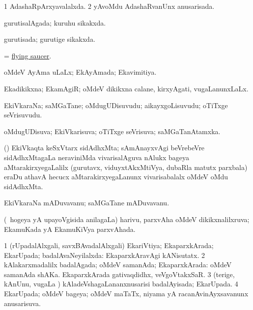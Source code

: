 \bentry
{} 
\gl{\gu}
\bmng
\bnum
\num{1} AdashaRpArxyavalalxda. 
\num{2} yAvoMdu AdashaRvanUnx anusarisada. 
\enum
\emng
\eentry

\bentry
{} 
\gl{\gu}
\expl{}
\bmng
gurutisalAgada; kuruhu sikakxda. 
\emng
\eentry

\bentry
{} 
\gl{\gu}
\expl{}
\bmng
gurutisada; gurutige sikakxda. 
\emng
\eentry

\bentry
{}
\gl{\nA}
\expl{}
\bmng
= \hyperref{kandict_f.pdf}{F}{flying saucer}{flying saucer}. 
\emng
\eentry

\bentry
{} 
\gl{\gu}
\expl{}
\bmng
oMdeV AyAma uLaLx; EkAyAmada; Ekavimitiya. 
\emng
\eentry

\bentry
{} 
\gl{\gu}
\expl{}
\bmng
Ekadikikxna; EkamAgiR; oMdeV dikikxna calane, kirxyAgati, \mo vugaLanunxLaLx. 
\emng
\eentry

\bentry
{} 
\gl{\saMkiSx}
\expl{}
\bmng
{} 
\emng
\eentry

\bentry
{} 
\gl{\nA}
\expl{}
\bmng
EkiVkaraNa; saMGaTane; oMdugUDisuvudu; aikayxgoLisuvudu; oTiTxge seVrisuvudu. 
\emng
\eentry

\bentry
{} 
\gl{\gu}
\expl{}
\bmng
oMdugUDisuva; EkiVkarisuva; oTiTxge seVrisuva; saMGaTanAtamxka. 
\emng
\eentry

\bentry
{}
\gl{\nA}
\expl{}
\bmng
(\Bwvi) EkiVkaqta keSxVtarx sidAdhxMta; sAmAnayxvAgi beVrebeVre sidAdhxMtagaLa neraviniMda vivarisalAguva nAlukx bageya aMtarakirxyegaLalilx (gurutavx, viduyxtAkxMtiVya, dubaRla matutx parxbala) eraDu athavA hecucx aMtarakirxyegaLanunx vivarisabalalx oMdeV oMdu sidAdhxMta. 
\emng
\eentry

\bentry
{} 
\gl{\nA}
\expl{}
\bmng
EkiVkaraNa mADuvavanu; saMGaTane mADuvavanu. 
\emng
\eentry

\bentry
{} 
\gl{\gu}
\expl{}
\bmng
(\kanmu\ hogeya yA upayoVgisida anilagaLa) harivu, parxvAha oMdeV dikikxnalilxruva; EkamuKada yA EkamuKiVya parxvAhada. 
\emng
\eentry

\bentry
{} 
\gl{\gu}
\expl{}
\bmng
\bnum
\num{1} (rUpadalAlxgali, savxBAvadalAlxgali) EkariVtiya; EkaparxkArada; EkarUpada; badalAvaNeyilalxda:  EkaparxkAravAgi kANisutatx. 
\num{2} kAlakarxmadalilx badalAgada; oMdeV samanAda; EkaparxkArada:  oMdeV samanAda shAKa.  EkaparxkArada gativaqdidhx, veVgoVtakxSaR. 
\num{3} (terige, kAnUnu, \mo vugaLa \vi) kAladeVshagaLananxnusarisi badalAyisada; EkarUpada. 
\num{4} EkarUpada; oMdeV bageya; oMdeV maTaTx, niyama yA racanAvinAyxsavanunx anusarisuva. 
\enum
\emng
\eentry


